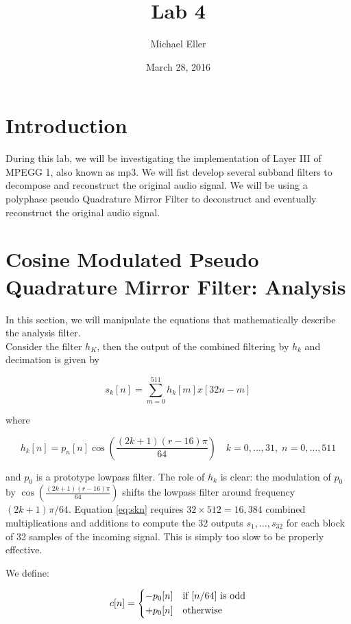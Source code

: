 \documentclass{article} %
\title{Lab 4}
\author{Michael Eller}
\date{March 28, 2016} %
\begin{document}
\maketitle

\tableofcontents
\clearpage
\section{Introduction}

During this lab, we will be investigating the implementation of Layer III
of MPEGG 1, also known as mp3. We will fist develop several subband
filters to decompose and reconstruct the original audio signal. We will
be using a polyphase pseudo Quadrature Mirror Filter to deconstruct
and eventually reconstruct the original audio signal. 

\section{Cosine Modulated Pseudo Quadrature Mirror Filter: Analysis}

In this section, we will manipulate the equations that mathematically
describe the analysis filter. \\


Consider the filter $h_K$, then the output of the combined filtering by $h_k$ and decimation is given by

\begin{equation}
\label{eq:skn}
s_k[n]=\sum\limits_{m=0}^{511} h_k[m]x[32n-m]
\end{equation}

where

\begin{equation}
\label{eq:hkn2}
h_k[n]=p_n[n] \cos \left( \frac{(2k+1)(r-16)\pi}{64}\right)
\quad k=0,\dots,31, \; n=0,\dots,511
\end{equation}

and $p_0$ is a prototype lowpass filter. The role of $h_k$ is clear: the
modulation of $p_0$ by $\cos \left( \frac{(2k+1)(r-16)\pi}{64}\right)$ shifts
the lowpass filter around frequency $(2k+1)\pi/64$. 
Equation \ref{eq:skn} requires $32 \times 512 = 16,384$ combined multiplications
and additions to compute the 32 outputs $s_{1},\dots,s_{32}$ for each block
of 32 samples of the incoming signal. This is simply too slow to be properly
effective. 



We define:

\begin{equation}
\label{eq:cn}
c[n]=
\begin{dcases*}
-p_0[n] & if $[n/64]$ is odd\\
+p_0[n]  & otherwise
\end{dcases*}
\end{equation}
\end{document}
